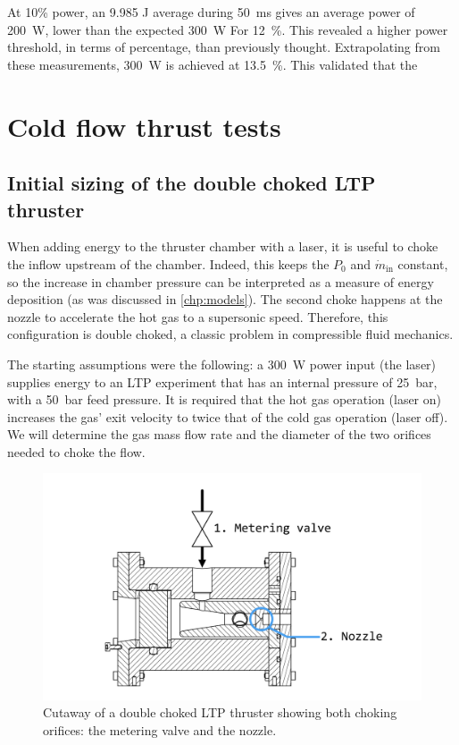         At 10\% power, an 9.985 J average during \qty{50}{ms} gives an average power of \qty{200}{W}, lower than the expected \qty{300}{W} For \qty{12}{\%}. This revealed a higher power threshold, in terms of percentage, than previously thought. Extrapolating from these measurements, \qty{300}{W} is achieved at \qty{13.5}{\%}. This validated that the

\section{Cold flow thrust tests}

    \subsection{Initial sizing of the double choked LTP thruster}

            When adding energy to the thruster chamber with a laser, it is useful to choke the inflow upstream of the chamber. Indeed, this keeps the $P_0$ and $\dot{m}_\mathrm{in}$ constant, so the increase in chamber pressure can be interpreted as a measure of energy deposition (as was discussed in \autoref{chp:models}). The second choke happens at the nozzle to accelerate the hot gas to a supersonic speed. Therefore, this configuration is double choked, a classic problem in compressible fluid mechanics.
            
            The starting assumptions were the following: a \qty{300}{W} power input (the laser) supplies energy to an LTP experiment that has an internal pressure of \qty{25}{bar}, with a \qty{50}{bar} feed pressure. It is required that the hot gas operation (laser on) increases the gas' exit velocity to twice that of the cold gas operation (laser off). We will determine the gas mass flow rate and the diameter of the two orifices needed to choke the flow.

            \begin{figure}[h]
                \centering
                \includegraphics[width=0.8\linewidth]{assets/3 design/Double choked LTP thruster.pdf}
                \caption{Cutaway of a double choked LTP thruster showing both choking orifices: the metering valve and the nozzle.}
                \label{fig:double choke sizing}
            \end{figure}
            
